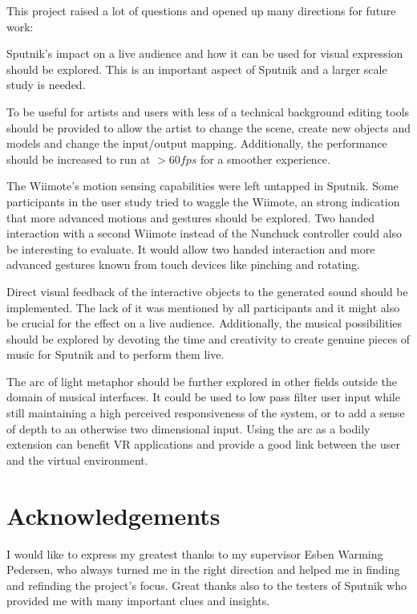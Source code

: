 \documentclass[10pt,a4paper]{scrartcl}
\begin{document}
This project raised a lot of questions and opened up many directions for future work:

Sputnik's impact on a live audience and how it can be used for visual expression should be explored. This is an important aspect of Sputnik and a larger scale study is needed.

To be useful for artists and users with less of a technical background editing tools should be provided to allow the artist to change the scene, create new objects and models and change the input/output mapping. Additionally, the performance should be increased to run at $> 60fps$ for a smoother experience.

The Wiimote's motion sensing capabilities were left untapped in Sputnik. Some participants in the user study tried to waggle the Wiimote, an strong indication that more advanced motions and gestures should be explored. Two handed interaction with a second Wiimote instead of the Nunchuck controller could also be interesting to evaluate. It would allow two handed interaction and more advanced gestures known from touch devices like pinching and rotating. 

Direct visual feedback of the interactive objects to the generated sound should be implemented. The lack of it was mentioned by all participants and it might also be crucial for the effect on a live audience. Additionally, the musical possibilities should be explored by devoting the time and creativity to create genuine pieces of music for Sputnik and to perform them live.

The arc of light metaphor should be further explored in other fields outside the domain of musical interfaces. It could be used to low pass filter user input while still maintaining a high perceived responsiveness of the system, or to add a sense of depth to an otherwise two dimensional input. Using the arc as a bodily extension can benefit VR applications and provide a good link between the user and the virtual environment.



\section{Acknowledgements}
I would like to express my greatest thanks to my supervisor Esben Warming Pedersen, who always turned me in the right direction and helped me in finding and refinding the project's focus. Great thanks also to the testers of Sputnik who provided me with many important clues and insights. 
\end{document}
